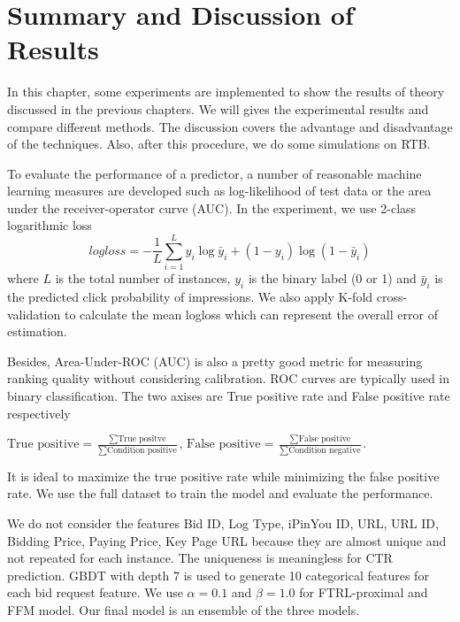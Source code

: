 \chapter{Summary and Discussion of Results}
\label{chapterlabel5}

In this chapter, some experiments are implemented to show the results of theory discussed in the previous chapters. We will gives the experimental results and compare different methods. The discussion covers the advantage and disadvantage of the techniques. Also, after this procedure, we do some simulations on RTB. 

To evaluate the performance of a predictor, a number of reasonable machine learning measures are developed such as log-likelihood of test data or the area under the receiver-operator curve (AUC). In the experiment, we use 2-class logarithmic loss
\begin{equation}
logloss = -\frac{1}{L}\sum_{i=1}^{L}y_i \log \bar{y}_i+(1-y_i) \log (1-\bar{y}_i)
\end{equation}
where $L$ is the total number of instances, $y_i$ is the binary label (0 or 1) and $\bar{y}_i$ is the predicted click probability of impressions. We also apply K-fold cross-validation to calculate the mean logloss which can represent the overall error of estimation.

Besides, Area-Under-ROC (AUC) is also a pretty good metric for measuring ranking quality without considering calibration. ROC curves are typically used in binary classification. The two axises are True positive rate and False positive rate respectively
\begin{center}
$\text{True positive} = \frac{\sum \text{True positve}}{\sum \text{Condition positive}}$, 
$\text{False positive} = \frac{\sum \text{False positive}}{\sum \text{Condition negative}}$.
\end{center}
It is ideal to maximize the true positive rate while minimizing the false positive rate. We use the full dataset to train the model and evaluate the performance.

We do not consider the features Bid ID, Log Type, iPinYou ID, URL, URL ID, Bidding Price, Paying Price, Key Page URL because they are almost unique and not repeated for each instance. The uniqueness is meaningless for CTR prediction. GBDT with depth 7 is used to generate 10 categorical features for each bid request feature. We use $\alpha=0.1$ and $\beta=1.0$ for FTRL-proximal and FFM model. Our final model is an ensemble of the three models. 

